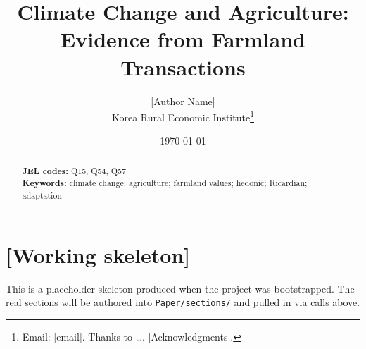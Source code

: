 \documentclass[11pt]{article}
\title{Climate Change and Agriculture: \\ {Evidence from Farmland Transactions}}
\author{%
  {[Author Name]} \\
  Korea Rural Economic Institute\thanks{Email: [email]. Thanks to \ldots. [Acknowledgments].}
}
\date{\today}
\begin{document}
\maketitle

\begin{abstract}
\medskip

\noindent\textbf{JEL codes:} Q15, Q54, Q57 \\
\noindent\textbf{Keywords:} climate change; agriculture; farmland values;
hedonic; Ricardian; adaptation
\end{abstract}

\bigskip


% 
% 
% 
% 
% 
% 
% 
% 

\section*{[Working skeleton]}
This is a placeholder skeleton produced when the project was bootstrapped. The
real sections will be authored into \texttt{Paper/sections/} and pulled in via
\verb|| calls above.





% 
% 
% 
\end{document}
